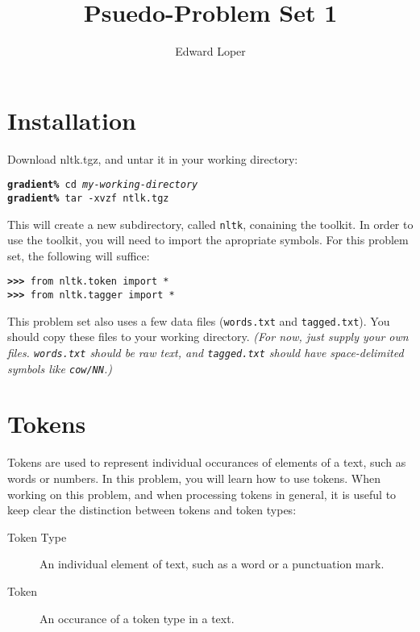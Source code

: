 \documentclass[11pt]{article}
\begin{document}
\title{Psuedo-Problem Set 1}
\author{Edward Loper}
\maketitle

\section{Installation}

Download nltk.tgz, and untar it in your working directory:

\noindent\begin{tabbing}
\tt\textbf{gradient\%} cd \textit{my-working-directory} \\
\tt\textbf{gradient\%} tar -xvzf ntlk.tgz
\end{tabbing}

\noindent
This will create a new subdirectory, called \texttt{nltk}, conaining
the toolkit.  In order to use the toolkit, you will need to import the
apropriate symbols.  For this problem set, the following will suffice:

\noindent\begin{tabbing}
\tt\textbf{>>>} from nltk.token import * \\
\tt\textbf{>>>} from nltk.tagger import *
\end{tabbing}

\noindent
This problem set also uses a few data files (\texttt{words.txt} and
\texttt{tagged.txt}).  You should copy these files to your working
directory.  \textit{(For now, just supply your own files.
\texttt{words.txt} should be raw text, and \texttt{tagged.txt} should
have space-delimited symbols like \texttt{cow/NN}.)}

\section{Tokens}

Tokens are used to represent individual occurances of elements of a
text, such as words or numbers.  In this problem, you will learn how
to use tokens.  When working on this problem, and when processing
tokens in general, it is useful to keep clear the distinction between
tokens and token types:

\begin{description}
  \item[Token Type] An individual element of text, such as a word or a
       punctuation mark.
  \item[Token] An occurance of a token type in a text.
\end{description}
\end{document}
